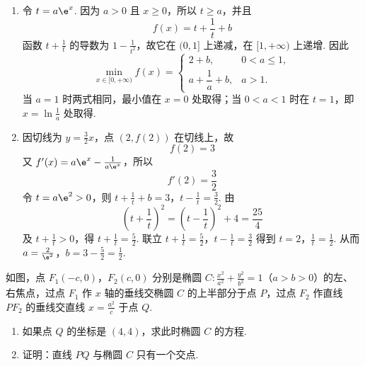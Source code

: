 \begin{solution}
\begin{enumerate}
\item 令 \(t=a\e^x\). 因为 \(a>0\) 且 \(x\geqslant0\)，所以 \(t\geqslant a\)，并且
\[
f(x)=t+\frac1t+b
\]
函数 \(t+\frac1t\) 的导数为 \(1-\frac1{t^2}\)，故它在 \((0,1]\) 上递减，在 \([1,+\infty)\) 上递增. 因此
\[
\min_{x\in[0,+\infty)}f(x)=
\begin{cases}
2+b,&0<a\leqslant1,\\
a+\dfrac1a+b,&a>1.
\end{cases}
\]
当 \(a=1\) 时两式相同，最小值在 \(x=0\) 处取得；当 \(0<a<1\) 时在 \(t=1\)，即 \(x=\ln\frac1a\) 处取得.
\item 因切线为 \(y=\frac32x\)，点 \((2,f(2))\) 在切线上，故
\[
f(2)=3
\]
又 \(f'(x)=a\e^x-\frac1{a\e^x}\)，所以
\[
f'(2)=\frac32
\]
令 \(t=a\e^2>0\)，则
\(t+\frac1t+b=3\)，\(t-\frac1t=\frac32\).
由
\[
\left(t+\frac1t\right)^2
=\left(t-\frac1t\right)^2+4
=\frac{25}{4}
\]
及 \(t+\frac1t>0\)，得 \(t+\frac1t=\frac52\). 联立
\(t+\frac1t=\frac52\)，\(t-\frac1t=\frac32\)
得到 \(t=2\)，\(\frac1t=\frac12\). 从而
\(a=\frac2{\e^2}\)，\(b=3-\frac52=\frac12\).
\end{enumerate}
\end{solution}

\begin{problem}
如图，点 \(F_{1}(-c,0)\)，\(F_{2}(c,0)\) 分别是椭圆 \(C:\frac{x^{2}}{a^{2}}+\frac{y^{2}}{b^{2}}=1\)（\(a>b>0\)）的左、右焦点，过点 \(F_{1}\) 作 \(x\) 轴的垂线交椭圆 \(C\) 的上半部分于点 \(P\)，过点 \(F_{2}\) 作直线 \(PF_{2}\) 的垂线交直线 \(x=\frac{a^{2}}{c}\) 于点 \(Q\).

\begin{enumerate}
\item 如果点 \(Q\) 的坐标是 \((4,4)\)，求此时椭圆 \(C\) 的方程.
\item 证明：直线 \(PQ\) 与椭圆 \(C\) 只有一个交点.
\end{enumerate}

\end{problem}

